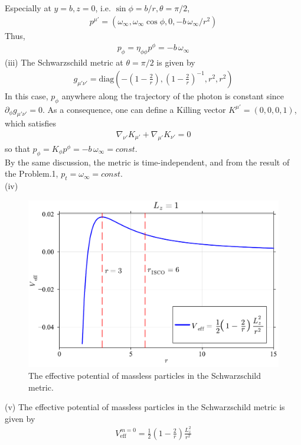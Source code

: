 \documentclass[12pt]{article}
\begin{document}
Especially at $y = b, z = 0$, i.e. $\sin{\phi} = b / r, \theta = \pi/2$,
\begin{align}
p^{\mu'} = \left( \omega_{\infty}, \omega_{\infty} \cos{\phi}, 0, - b\,\omega_{\infty}/r^2 \right)
\end{align}
Thus, 
\begin{align}
p_{\phi} = \eta_{\phi \phi} p^{\phi} = - b\,\omega_{\infty}
\end{align}
(iii) The Schwarzschild metric at $\theta = \pi/2$ is given by
\begin{align}
g_{\mu' \nu'} = \mathrm{diag} \left(- \left(1 - \frac{2}{r}\right), \left(1 - \frac{2}{r}\right)^{-1}, r^2, r^2 \right)
\end{align}
In this case, $p_{\phi}$ anywhere along the trajectory of the photon is constant since $\partial_{\phi} g_{\mu' \nu'} = 0$. As a consequence, one can define a Killing vector $K^{\mu'} = \left(0, 0, 0, 1\right)$, which satisfies
\begin{align}
\nabla_{\nu'} K_{\mu'} + \nabla_{\mu'} K_{\nu'} = 0
\end{align}
so that $p_{\phi} = K_{\phi} p^{\phi} = - b\,\omega_{\infty} = const.$\\
By the same discussion, the metric is time-independent, and from the result of the Problem.1, $p_{t} = \omega_{\infty} = const.$\\
(iv)
\begin{figure}[H]
  \begin{center}
  \includegraphics[width=0.7\linewidth]{Massless_Effective_potential.pdf}
  \caption{The effective potential of massless particles in the Schwarzschild metric.}
  \label{Curves}
  \end{center}
\end{figure}
(v)
The effective potential of massless particles in the Schwarzschild metric is given by
\begin{align}
V_{\mathrm{eff}}^{m =0} = \frac{1}{2}\left(1 - \frac{2}{r}\right) \frac{L_z^2}{r^2}
\end{align}
\end{document}
